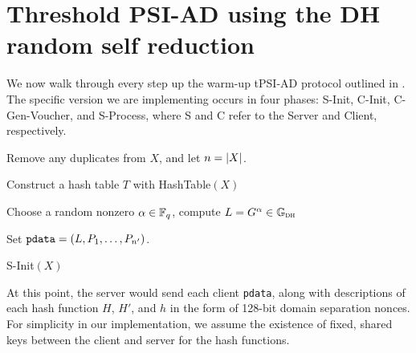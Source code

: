 
\section{Threshold PSI-AD using the DH random self reduction} %
\label{sec:threshold_psi_ad_using_the_dh_random_self_reduction}

We now walk through every step up the warm-up tPSI-AD protocol outlined in \cite{bhowmick2021apple}. The specific version we are implementing occurs in four phases: {\sf S-Init}, {\sf C-Init}, {\sf C-Gen-Voucher}, and {\sf S-Process}, where {\sf S} and {\sf C} refer to the Server and Client, respectively.

\begin{algorithm}[H]
\DontPrintSemicolon
{}
  Remove any duplicates from $X$, and let $n = \left\lvert X\right\rvert$.


     Construct a hash table $T$ with {\sf HashTable}$(X)$\;

   Choose a random nonzero $\alpha \in \mathbb{F}_q$, compute $L = G^\alpha \in \mathbb{G}_{\textsc{dh}}$\;
     

    Set $\texttt{pdata} = \left(L, P_1, \dots, P_{n'}\right)$.


\caption{ {\sf S-Init}$(X)$}
\label{algo:s_init}
\end{algorithm}

At this point, the server would send each client \texttt{pdata}, along with descriptions of each hash function $H$, $H'$, and $h$ in the form of 128-bit domain separation nonces. For simplicity in our implementation, we assume the existence of fixed, shared keys between the client and server for the hash functions.

